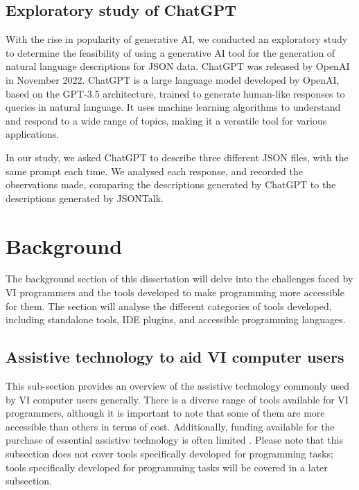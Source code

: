 \documentclass{l4proj}
\begin{document}
\section{Exploratory study of ChatGPT}

With the rise in popularity of generative AI, we conducted an exploratory study to determine the feasibility of using a generative AI tool for the generation of natural language descriptions for JSON data. ChatGPT \cite{chatgpt} was released by OpenAI in November 2022. ChatGPT is a large language model developed by OpenAI, based on the GPT-3.5 architecture, trained to generate human-like responses to queries in natural language. It uses machine learning algorithms to understand and respond to a wide range of topics, making it a versatile tool for various applications.

In our study, we asked ChatGPT to describe three different JSON files, with the same prompt each time. We analysed each response, and recorded the observations made, comparing the descriptions generated by ChatGPT to the descriptions generated by JSONTalk.

\chapter{Background}

The background section of this dissertation will delve into the challenges faced by VI programmers and the tools developed to make programming more accessible for them. The section will analyse the different categories of tools developed, including standalone tools, IDE plugins, and accessible programming languages.

\section{Assistive technology to aid VI computer users}

This sub-section provides an overview of the assistive technology commonly used by VI computer users generally. There is a diverse range of tools available for VI programmers, although it is important to note that some of them are more accessible than others in terms of cost. Additionally, funding available for the purchase of essential assistive technology is often limited \cite{assistive_tech_funding}. Please note that this subsection does not cover tools specifically developed for programming tasks; tools specifically developed for programming tasks will be covered in a later subsection. 
\end{document}
